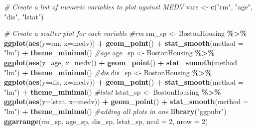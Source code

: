 \documentclass[
]{book}
\newenvironment{Shaded}{\begin{snugshade}}{\end{snugshade}}
\newcommand{\AttributeTok}[1]{\textcolor[rgb]{0.13,0.29,0.53}{#1}}
\newcommand{\CommentTok}[1]{\textcolor[rgb]{0.56,0.35,0.01}{\textit{#1}}}
\newcommand{\DecValTok}[1]{\textcolor[rgb]{0.00,0.00,0.81}{#1}}
\newcommand{\FunctionTok}[1]{\textcolor[rgb]{0.13,0.29,0.53}{\textbf{#1}}}
\newcommand{\NormalTok}[1]{#1}
\newcommand{\OtherTok}[1]{\textcolor[rgb]{0.56,0.35,0.01}{#1}}
\newcommand{\SpecialCharTok}[1]{\textcolor[rgb]{0.81,0.36,0.00}{\textbf{#1}}}
\newcommand{\StringTok}[1]{\textcolor[rgb]{0.31,0.60,0.02}{#1}}
\begin{document}
\begin{Shaded}
\begin{Highlighting}[]
\CommentTok{\# Create a list of numeric variables to plot against MEDV}
\NormalTok{vars }\OtherTok{\textless{}{-}} \FunctionTok{c}\NormalTok{(}\StringTok{"rm"}\NormalTok{, }\StringTok{"age"}\NormalTok{, }\StringTok{"dis"}\NormalTok{, }\StringTok{"lstat"}\NormalTok{)}

\CommentTok{\# Create a scatter plot for each variable}
\CommentTok{\#rm}
\NormalTok{rm\_sp }\OtherTok{\textless{}{-}}\NormalTok{ BostonHousing }\SpecialCharTok{\%\textgreater{}\%} 
  \FunctionTok{ggplot}\NormalTok{(}\FunctionTok{aes}\NormalTok{(}\AttributeTok{y=}\NormalTok{rm, }\AttributeTok{x=}\NormalTok{medv)) }\SpecialCharTok{+}
    \FunctionTok{geom\_point}\NormalTok{() }\SpecialCharTok{+} 
     \FunctionTok{stat\_smooth}\NormalTok{(}\AttributeTok{method =} \StringTok{"lm"}\NormalTok{) }\SpecialCharTok{+} 
       \FunctionTok{theme\_minimal}\NormalTok{()}
\CommentTok{\#age}
\NormalTok{age\_sp }\OtherTok{\textless{}{-}}\NormalTok{ BostonHousing }\SpecialCharTok{\%\textgreater{}\%} 
  \FunctionTok{ggplot}\NormalTok{(}\FunctionTok{aes}\NormalTok{(}\AttributeTok{y=}\NormalTok{age, }\AttributeTok{x=}\NormalTok{medv)) }\SpecialCharTok{+}
    \FunctionTok{geom\_point}\NormalTok{() }\SpecialCharTok{+} 
     \FunctionTok{stat\_smooth}\NormalTok{(}\AttributeTok{method =} \StringTok{"lm"}\NormalTok{) }\SpecialCharTok{+} 
       \FunctionTok{theme\_minimal}\NormalTok{()}
\CommentTok{\#dis}
\NormalTok{dis\_sp }\OtherTok{\textless{}{-}}\NormalTok{ BostonHousing }\SpecialCharTok{\%\textgreater{}\%} 
  \FunctionTok{ggplot}\NormalTok{(}\FunctionTok{aes}\NormalTok{(}\AttributeTok{y=}\NormalTok{dis, }\AttributeTok{x=}\NormalTok{medv)) }\SpecialCharTok{+}
    \FunctionTok{geom\_point}\NormalTok{() }\SpecialCharTok{+} 
     \FunctionTok{stat\_smooth}\NormalTok{(}\AttributeTok{method =} \StringTok{"lm"}\NormalTok{) }\SpecialCharTok{+} 
       \FunctionTok{theme\_minimal}\NormalTok{()}
\CommentTok{\#lstat}
\NormalTok{lstat\_sp }\OtherTok{\textless{}{-}}\NormalTok{ BostonHousing }\SpecialCharTok{\%\textgreater{}\%} 
  \FunctionTok{ggplot}\NormalTok{(}\FunctionTok{aes}\NormalTok{(}\AttributeTok{y=}\NormalTok{lstat, }\AttributeTok{x=}\NormalTok{medv)) }\SpecialCharTok{+}
    \FunctionTok{geom\_point}\NormalTok{() }\SpecialCharTok{+} 
     \FunctionTok{stat\_smooth}\NormalTok{(}\AttributeTok{method =} \StringTok{"lm"}\NormalTok{) }\SpecialCharTok{+} 
       \FunctionTok{theme\_minimal}\NormalTok{()}
\CommentTok{\#adding all plots in one}
\FunctionTok{library}\NormalTok{(}\StringTok{"ggpubr"}\NormalTok{)}
\FunctionTok{ggarrange}\NormalTok{(rm\_sp, age\_sp,}
\NormalTok{          dis\_sp, lstat\_sp,}
          \AttributeTok{ncol =} \DecValTok{2}\NormalTok{, }\AttributeTok{nrow =} \DecValTok{2}\NormalTok{)}
\end{Highlighting}
\end{Shaded}
\end{document}
